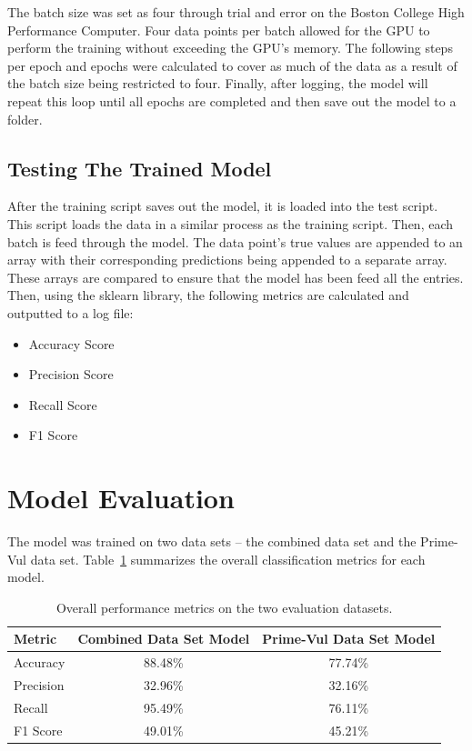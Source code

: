 \documentclass{article}
\begin{document}
The batch size was set as four through trial and error on the Boston College High Performance Computer. Four data points per batch allowed for the GPU to perform the training without exceeding the GPU's memory. The following steps per epoch and epochs were calculated to cover as much of the data as a result of the batch size being restricted to four. Finally, after logging, the model will repeat this loop until all epochs are completed and then save out the model to a folder.

\subsection{Testing The Trained Model}

After the training script saves out the model, it is loaded into the test script. This script loads the data in a similar process as the training script. Then, each batch is feed through the model. The data point's true values are appended to an array with their corresponding predictions being appended to a separate array. These arrays are compared to ensure that the model has been feed all the entries. Then, using the sklearn library, the following metrics are calculated and outputted to a log file:

\begin{itemize}
\item Accuracy Score
\item Precision Score
\item Recall Score
\item F1 Score
\end{itemize}

\section{Model Evaluation}

The model was trained on two data sets -- the combined data set and the Prime-Vul data set. Table~\ref{tab:metrics} summarizes the overall classification metrics for each model.

\begin{table}[ht]
  \centering
  \begin{tabular}{|l|c|c|}
    \hline
    \textbf{Metric}   & \textbf{Combined Data Set Model} & \textbf{Prime-Vul Data Set Model} \\ 
    \hline 
    Accuracy          & 88.48\%                          & 77.74\%                  \\ 
    \hline
    Precision         & 32.96\%                          & 32.16\%                  \\ 
    \hline
    Recall            & 95.49\%                          & 76.11\%                  \\ 
    \hline
    F1 Score          & 49.01\%                          & 45.21\%                  \\ 
    \hline
  \end{tabular}
  \caption{Overall performance metrics on the two evaluation datasets.}
  \label{tab:metrics}
\end{table}
\end{document}
